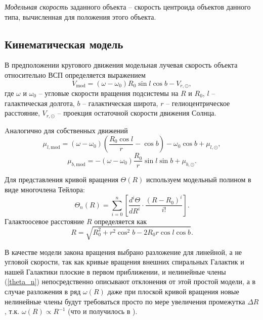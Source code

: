 \documentclass{matmex-diploma-custom}
\begin{document}
\textit{Модельная скорость} заданного объекта -- скорость центроида объектов данного типа, вычисленная для положения этого объекта.





\subsection{Кинематическая модель}

В предположении кругового движения модельная лучевая скорость объекта относительно ВСП определяется выражением \cite{Kulik}
\begin{equation}
        V_{\mathrm{mod}} = (\omega - \omega_0) R_0 \sin{l} \cos{b} - V_{r, \odot},
\end{equation}
где $\omega$ и $\omega_0$ -- угловые скорости вращения подсистемы на $R$ и $R_0$, $l$ -- галактическая долгота, $b$ -- галактическая широта, $r$ -- гелиоцентрическое расстояние, $V_{r, \odot}$ -- проекция остаточной скорости движения Солнца.

Aналогично для собственных движений \cite{Kulik}
\begin{equation}
        \mu_{l, \mathrm{mod}} = (\omega - \omega_0) \left( \frac{R_0\cos{l}}{r} - \cos{b} \right) - \omega_0 \cos{b} + \mu_{l, \odot},
\end{equation}
\begin{equation}
        \mu_{b, \mathrm{mod}} = - (\omega - \omega_0) \frac{R_0}{r} \sin{l} \sin{b} + \mu_{b, \odot}.
\end{equation}

\par Для представления кривой вращения $\Theta(R)$ используем модельный полином в виде многочлена Тейлора:
\begin{equation} \label{theta_n}
        \Theta_n(R)=\sum _{i=0}^{n} \left[ \frac{d^i\Theta}{dR^i} \cdot \frac{(R - R_0)^i}{i!} \right].
\end{equation}
Галактоосевое расстояние $R$ определяется как \cite{Kulik}
\begin{equation}
	R = \sqrt{R_0^2 + r^2 \cos^2{b} - 2R_0 r \cos{l} \cos{b}}.
\end{equation}

\par В качестве модели закона вращения выбрано разложение для линейной, а не угловой скорости, так как кривые вращения внешних спиральных Галактик и нашей Галактики плоские в первом приближении, и нелинейные члены (\ref{theta_n}) непосредственно описывают отклонения от этой простой модели, а в случае разложения в ряд $\omega(R)$ даже при плоской кривой вращения новые нелинейные члены будут требоваться просто по мере увеличения промежутка $\Delta R$, т.к. $\omega(R) \propto R^{-1}$ (что и получилось в \cite{Rastorguev}).
\end{document}
